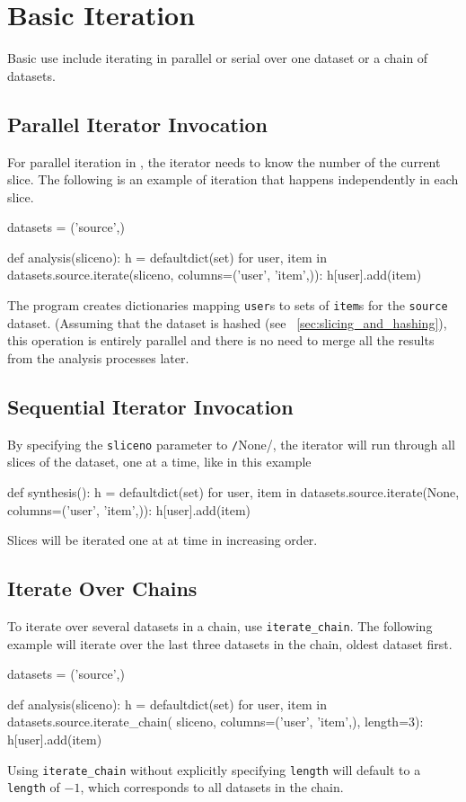 \section{Basic Iteration}
Basic use include iterating in parallel or serial over one dataset or
a chain of datasets.



\subsection*{Parallel Iterator Invocation}
For parallel iteration in \analysis, the iterator needs to know the
number of the current slice.  The following is an example of iteration
that happens independently in each slice.

\begin{python}
datasets = ('source',)

def analysis(sliceno):
    h = defaultdict(set)
    for user, item in datasets.source.iterate(sliceno,
                                              columns=('user', 'item',)):
        h[user].add(item)
\end{python}
The program creates dictionaries mapping \texttt{user}s to sets of
\texttt{item}s for the \texttt{source} dataset.  (Assuming that
the dataset is hashed (see ~\ref{sec:slicing_and_hashing}), this operation is entirely parallel
and there is no need to merge all the results from the analysis
processes later.



\subsection*{Sequential Iterator Invocation}
By specifying the \texttt{sliceno} parameter to
\texttt/None/, the iterator will run through all slices of
the dataset, one at a time, like in this example
\begin{python}
def synthesis():
    h = defaultdict(set)
    for user, item in datasets.source.iterate(None,
                                              columns=('user', 'item',)):
        h[user].add(item)
\end{python}
Slices will be iterated one at at time in increasing order.



\subsection*{Iterate Over Chains}
To iterate over several datasets in a chain, use
\texttt{iterate\_chain}.  The following example will iterate over the
last three datasets in the chain, oldest dataset first.
\begin{python}
datasets = ('source',)

def analysis(sliceno):
    h = defaultdict(set)
    for user, item in datasets.source.iterate_chain(
                      sliceno, columns=('user', 'item',), length=3):
        h[user].add(item)
\end{python}
Using \texttt{iterate\_chain} without explicitly specifying
\texttt{length} will default to a \texttt{length} of $-1$, which
corresponds to all datasets in the chain.

